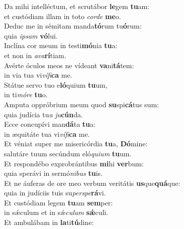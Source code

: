 \evenverse Da mihi intelléctum, et scrutábor \textbf{le}gem \textbf{tu}am:~\*\\
\evenverse et custódiam illam in toto \textit{cor}\textit{de} \textbf{me}o.\\
\oddverse Deduc me in sémitam manda\textbf{tó}rum tu\textbf{ó}rum:~\*\\
\oddverse quia \textit{i}\textit{psam} \textbf{vó}lui.\\
\evenverse Inclína cor meum in testi\textbf{mó}nia \textbf{tu}a:~\*\\
\evenverse et non in \textit{a}\textit{va}\textbf{rí}tiam.\\
\oddverse Avérte óculos meos ne vídeant \textbf{va}ni\textbf{tá}tem:~\*\\
\oddverse in via tua vi\textit{ví}\textit{fi}\textbf{ca} me.\\
\evenverse Státue servo tuo e\textbf{ló}quium \textbf{tu}um,~\*\\
\evenverse in ti\textit{mó}\textit{re} \textbf{tu}o.\\
\oddverse Amputa oppróbrium meum quod \textbf{su}spi\textbf{cá}tus sum:~\*\\
\oddverse quia judícia tu\textit{a} \textit{ju}\textbf{cún}da.\\
\evenverse Ecce concupívi man\textbf{dá}ta \textbf{tu}a:~\*\\
\evenverse in æquitáte tua vi\textit{ví}\textit{fi}\textbf{ca} me.\\
\oddverse Et véniat super me misericórdia \textbf{tu}a, \textbf{Dó}mine:~\*\\
\oddverse salutáre tuum secúndum eló\textit{qui}\textit{um} \textbf{tu}um.\\
\evenverse Et respondébo exprobrántibus \textbf{mi}hi \textbf{ver}bum:~\*\\
\evenverse quia sperávi in sermó\textit{ni}\textit{bus} \textbf{tu}is.\\
\oddverse Et ne áuferas de ore meo verbum veritátis \textbf{us}que\textbf{quá}que:~\*\\
\oddverse quia in judíciis tuis su\textit{per}\textit{spe}\textbf{rá}vi.\\
\evenverse Et custódiam legem \textbf{tu}am \textbf{sem}per:~\*\\
\evenverse in sǽculum et in sǽ\textit{cu}\textit{lum} \textbf{sǽ}culi.\\
\oddverse Et ambulábam in \textbf{la}ti\textbf{tú}dine:~\*\\
